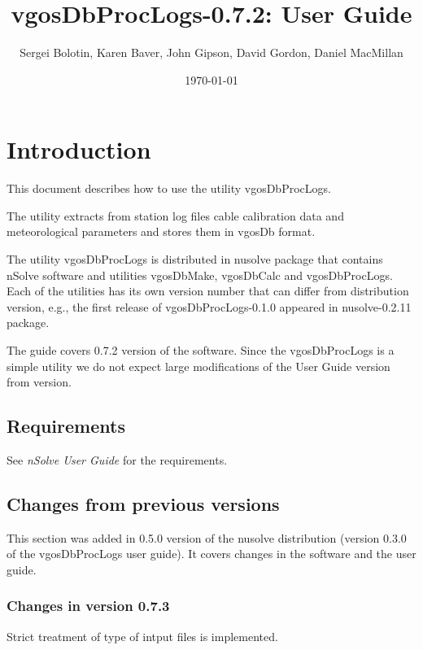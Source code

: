 \documentclass [10pt,letterpaper]{report}
\newcommand{\nuSolve}{\greektext n\latintext Solve}
\newcommand{\thisVersion}{0.7.2}
\begin{document}
\title{vgosDbProcLogs-\thisVersion{}: User Guide}

\author{
Sergei Bolotin,
Karen Baver,
John Gipson,
David Gordon,
Daniel MacMillan
}

\date{\today}


\maketitle

\tableofcontents



\def\leftSp      {48mm}
\def\riteSp     {113mm}


\chapter{Introduction}
\label{intro}

This document describes how to use the utility vgosDbProcLogs.

The utility extracts from station log files cable calibration data and
meteorological parameters and stores them in vgosDb format.

The utility vgosDbProcLogs is distributed in nusolve package that contains \nuSolve{}
software and utilities vgosDbMake, vgosDbCalc and vgosDbProcLogs. Each of the
utilities has its own version number that can differ from distribution version,
e.g., the first release of vgosDbProcLogs-0.1.0 appeared in nusolve-0.2.11 package.

The guide covers \thisVersion{} version of the software. Since the vgosDbProcLogs
is a simple utility we do not expect large modifications of the User Guide version
from version.


\section{Requirements}
\label{intro_reqs}

See \emph{\nuSolve{} User Guide} for the requirements.


\section{Changes from previous versions}
\label{intro_changes}

This section was added in 0.5.0 version of the nusolve distribution
(version 0.3.0 of the vgosDbProcLogs user guide). It covers changes in
the software and the user guide.


\subsection{Changes in version 0.7.3}
Strict treatment of type of intput files is implemented.
\end{document}
